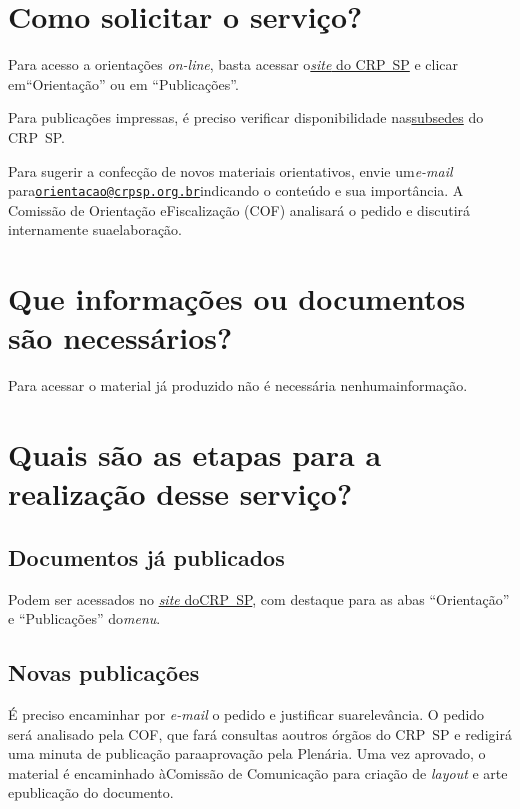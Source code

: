 \section{Como solicitar o serviço?}

Para acesso a orientações \emph{on-line}, basta acessar o\href{http://www.crpsp.org}{\emph{site} do CRP~SP} e clicar em``Orientação'' ou em ``Publicações''.

Para publicações impressas, é preciso verificar disponibilidade nas\href{https://www.crpsp.org/sede/index}{subsedes} do CRP~SP.

Para sugerir a confecção de novos materiais orientativos, envie um\emph{e-mail} para\href{mailto:orientacao@crpsp.org.br}{\nolinkurl{orientacao@crpsp.org.br}}indicando o conteúdo e sua importância. A Comissão de Orientação eFiscalização (COF) analisará o pedido e discutirá internamente suaelaboração.

\section{Que informações ou documentos são necessários?}

Para acessar o material já produzido não é necessária nenhumainformação.

\section{Quais são as etapas para a realização desse serviço?}

\subsection{Documentos já publicados}

Podem ser acessados no \href{http://www.crpsp.org}{\emph{site} doCRP~SP}, com destaque para as abas ``Orientação'' e ``Publicações'' do\emph{menu}.

\subsection{Novas publicações}

É preciso encaminhar por \emph{e-mail} o pedido e justificar suarelevância. O pedido será analisado pela COF, que fará consultas aoutros órgãos do CRP~SP e redigirá uma minuta de publicação paraaprovação pela Plenária. Uma vez aprovado, o material é encaminhado àComissão de Comunicação para criação de \emph{layout} e arte epublicação do documento.

